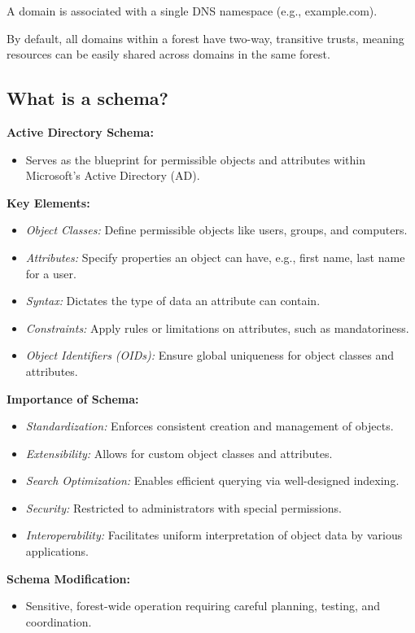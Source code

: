 \documentclass{article}
\begin{document}
A domain is associated with a single DNS namespace (e.g., example.com).

By default, all domains within a forest have two-way, 
transitive trusts, meaning resources can be easily 
shared across domains in the same forest.

\subsection{What is a schema?}
\textbf{Active Directory Schema:}
\begin{itemize}
  \item Serves as the blueprint for permissible objects and attributes within Microsoft's Active Directory (AD).
\end{itemize}

\textbf{Key Elements:}
\begin{itemize}
  \item \textit{Object Classes:} Define permissible objects like users, groups, and computers.
  \item \textit{Attributes:} Specify properties an object can have, e.g., first name, last name for a user.
  \item \textit{Syntax:} Dictates the type of data an attribute can contain.
  \item \textit{Constraints:} Apply rules or limitations on attributes, such as mandatoriness.
  \item \textit{Object Identifiers (OIDs):} Ensure global uniqueness for object classes and attributes.
\end{itemize}

\textbf{Importance of Schema:}
\begin{itemize}
  \item \textit{Standardization:} Enforces consistent creation and management of objects.
  \item \textit{Extensibility:} Allows for custom object classes and attributes.
  \item \textit{Search Optimization:} Enables efficient querying via well-designed indexing.
  \item \textit{Security:} Restricted to administrators with special permissions.
  \item \textit{Interoperability:} Facilitates uniform interpretation of object data by various applications.
\end{itemize}

\textbf{Schema Modification:}
\begin{itemize}
  \item Sensitive, forest-wide operation requiring careful planning, testing, and coordination.
\end{itemize}
\end{document}
